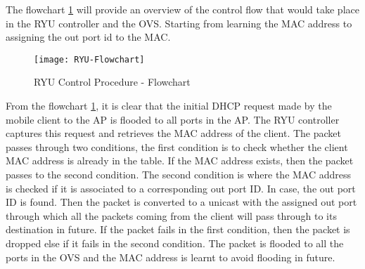 %	
The flowchart  \ref{fig:RYU-Flowchart} will provide an overview of the control flow that would take place in the RYU controller and the OVS. Starting from learning the MAC address to assigning the out port id to the MAC.

\begin{figure}
	\centering
	\texttt{[image: RYU-Flowchart]}
	\caption {RYU Control Procedure - Flowchart}
	\label{fig:RYU-Flowchart}
	\vspace{-10pt}
\end{figure}

From the flowchart \ref{fig:RYU-Flowchart}, it is clear that the initial DHCP request made by the mobile client to the AP is flooded to all ports in the AP. The RYU controller captures this request and retrieves the MAC address of the client. The packet passes through two conditions, the first condition is to check whether the client MAC address is already in the table. If the MAC address exists, then the packet passes to the second condition. The second condition is where the MAC address is checked if it is associated to a corresponding out port ID.  In case, the out port ID is found. Then the packet is converted to a unicast with the assigned out port through which all the packets coming from the client will pass through to its destination in future. If the packet fails in the first condition, then the packet is dropped else if it fails in the second condition. The packet is flooded to all the ports in the OVS and the MAC address is learnt to avoid flooding in future.

